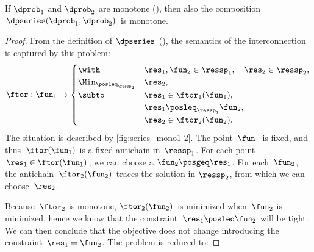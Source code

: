 \begin{proposition}
\label{pro:series-monotone}If $\dprob_{1}$ and $\dprob_{2}$ are
monotone (), then also the composition $\dpseries(\dprob_{1},\dprob_{2})$
is monotone.
\end{proposition}
\begin{proof}
From the definition of $\dpseries$ (),
the semantics of the interconnection is captured by this problem:
\begin{equation}
\ftor:\fun_{1}\mapsto\begin{cases}
\with & \res_{1},\fun_{2}\in\ressp_{1},\quad\res_{2}\in\ressp_{2},\\
\Min_{\posleq_{\ressp_{2}}} & \res_{2},\\
\subto & \res_{1}\in\ftor_{1}(\fun_{1}),\\
 & \res_{1}\posleq_{\ressp_{1}}\fun_{2},\\
 & \res_{2}\in\ftor_{2}(\fun_{2}).
\end{cases}\label{eq:dede}
\end{equation}
The situation is described by \cref{fig:series_mono1-2}. The point~$\fun_{1}$
is fixed, and thus~$\ftor(\fun_{1})$ is a fixed antichain in~$\ressp_{1}$.
For each point $\res_{1}\in\ftor(\fun_{1})$, we can choose a $\fun_{2}\posgeq\res_{1}$.
For each~$\fun_{2}$, the antichain~$\ftor_{2}(\fun_{2})$ traces
the solution in $\ressp_{2}$, from which we can choose~$\res_{2}$.


\noindent Because~$\ftor_{2}$ is monotone, $\ftor_{2}(\fun_{2})$
is minimized when~$\fun_{2}$ is minimized, hence we know that the
constraint~$\res_{1}\posleq\fun_{2}$ will be tight. We can then
conclude that the objective does not change introducing the constraint~$\res_{1}=\fun_{2}$.
The problem is reduced to:


\end{proof}
